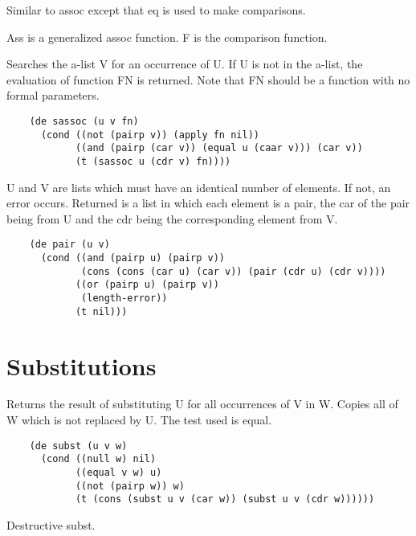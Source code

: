 {    Similar to assoc except that eq is used to make comparisons.
}

{    Ass  is  a  generalized assoc function.  F is the comparison
    function.
}

{    Searches the a-list V for  an occurrence of U.  If  U is not
    in the a-list, the evaluation of function  FN  is  returned.
    Note that FN should be a function with no formal parameters.
}
\begin{verbatim}
    (de sassoc (u v fn)
      (cond ((not (pairp v)) (apply fn nil))
            ((and (pairp (car v)) (equal u (caar v))) (car v))
            (t (sassoc u (cdr v) fn))))
\end{verbatim}

{    U  and  V are lists which  must have an identical number  of
    elements.  If not, an error occurs.  Returned is a  list  in
    which    each  element is a pair, the  car of the pair being
    from U  and  the  cdr  being  the   corresponding    element
    from V.
}
\begin{verbatim}
    (de pair (u v)
      (cond ((and (pairp u) (pairp v))
             (cons (cons (car u) (car v)) (pair (cdr u) (cdr v))))
            ((or (pairp u) (pairp v))
             (length-error))
            (t nil)))
\end{verbatim}
\section{Substitutions}


{    Returns the  result of  substituting U  for all  occurrences
    of  V  in W.   Copies all of  W which is not replaced  by U.
    The  test  used   is  equal.
}
\begin{verbatim}
    (de subst (u v w)
      (cond ((null w) nil)
            ((equal v w) u)
            ((not (pairp w)) w)
            (t (cons (subst u v (car w)) (subst u v (cdr w))))))
\end{verbatim}

{    Destructive subst.
}

